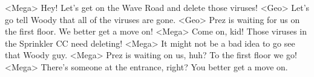 <Mega> Hey! Let's get on the Wave Road and delete those viruses! 
<Geo> Let's go tell Woody that all of the viruses are gone. 
<Geo> Prez is waiting for us on the first floor. We better get a move on! 
<Mega> Come on, kid! Those viruses in the Sprinkler CC need deleting! 
<Mega> It might not be a bad idea to go see that Woody guy. 
<Mega> Prez is waiting on us, huh? To the first floor we go! 
<Mega> There's someone at the entrance, right? You better get a move on. 
